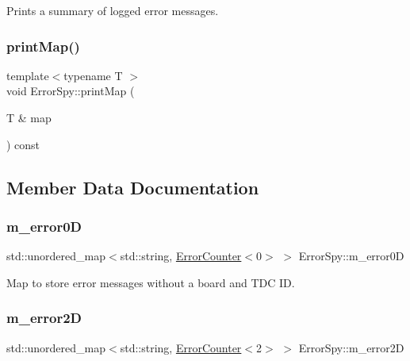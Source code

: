 Prints a summary of logged error messages. 

\mbox{\label{class_error_spy_abc5352997d5b107ac0662e7e087260a2}} 
\subsubsection{\texorpdfstring{print\+Map()}{printMap()}}
{\footnotesize\ttfamily template$<$typename T $>$ \\
void Error\+Spy\+::print\+Map (\begin{DoxyParamCaption}\item[{T \&}]{map }\end{DoxyParamCaption}) const\hspace{0.3cm}{\ttfamily [private]}}



\subsection{Member Data Documentation}
\mbox{\label{class_error_spy_a79ef6f818633163c9d553e681a0244dd}} 
\subsubsection{\texorpdfstring{m\+\_\+error0D}{m\_error0D}}
{\footnotesize\ttfamily std\+::unordered\+\_\+map$<$std\+::string, \hyperlink{class_error_counter}{Error\+Counter}$<$0$>$ $>$ Error\+Spy\+::m\+\_\+error0D\hspace{0.3cm}{\ttfamily [private]}}



Map to store error messages without a board and T\+DC ID. 

\mbox{\label{class_error_spy_a666798820a5fc5a4e35f6e325a59053e}} 
\subsubsection{\texorpdfstring{m\+\_\+error2D}{m\_error2D}}
{\footnotesize\ttfamily std\+::unordered\+\_\+map$<$std\+::string, \hyperlink{class_error_counter}{Error\+Counter}$<$2$>$ $>$ Error\+Spy\+::m\+\_\+error2D\hspace{0.3cm}{\ttfamily [private]}}



